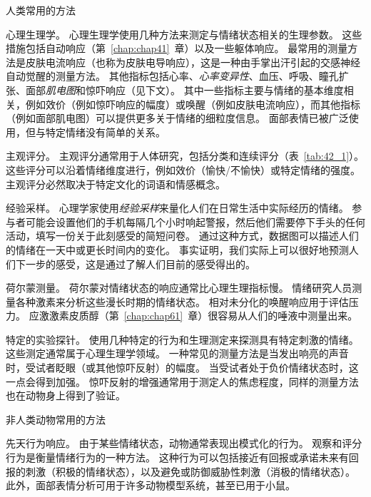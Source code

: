 \begin{proposition}[测量情绪的方法] \label{box:42_1}
	
	\quad \quad \textcolor[HTML]{00A652}{人类常用的方法}
	
	\quad \quad \textcolor[HTML]{00AEF7}{心理生理学}。
	心理生理学使用几种方法来测定与情绪状态相关的生理参数。
	这些措施包括自动响应（第~\ref{chap:chap41}~章）以及一些躯体响应。
	最常用的测量方法是皮肤电流响应（也称为皮肤电导响应），这是一种由手掌出汗引起的交感神经自动觉醒的测量方法。
	其他指标包括心率、\textit{心率变异性}、血压、呼吸、瞳孔扩张、面部\textit{肌电图}和惊吓响应（见下文）。
	其中一些指标主要与情绪的基本维度相关，例如效价（例如惊吓响应的幅度）或唤醒（例如皮肤电流响应），而其他指标（例如面部肌电图）可以提供更多关于情绪的细粒度信息。
	面部表情已被广泛使用，但与特定情绪没有简单的关系。
	
	\quad \quad \textcolor[HTML]{00AEF7}{主观评分}。
	主观评分通常用于人体研究，包括分类和连续评分（表~\ref{tab:42_1}）。
	这些评分可以沿着情绪维度进行，例如效价（愉快/不愉快）或特定情绪的强度。
	主观评分必然取决于特定文化的词语和情感概念。
	
	\quad \quad \textcolor[HTML]{00AEF7}{经验采样}。
	心理学家使用\textit{经验采样}来量化人们在日常生活中实际经历的情绪。
	参与者可能会设置他们的手机每隔几个小时响起警报，然后他们需要停下手头的任何活动，填写一份关于此刻感受的简短问卷。
	通过这种方式，数据图可以描述人们的情绪在一天中或更长时间内的变化。
	事实证明，我们实际上可以很好地预测人们下一步的感受，这是通过了解人们目前的感受得出的。
	
	\quad \quad \textcolor[HTML]{00AEF7}{荷尔蒙测量}。
	荷尔蒙对情绪状态的响应通常比心理生理指标慢。
	情绪研究人员测量各种激素来分析这些漫长时期的情绪状态。
	相对未分化的唤醒响应用于评估压力。
	应激激素皮质醇（第~\ref{chap:chap61}~章）很容易从人们的唾液中测量出来。
	
	\quad \quad \textcolor[HTML]{00AEF7}{特定的实验探针}。
	使用几种特定的行为和生理测定来探测具有特定刺激的情绪。
	这些测定通常属于心理生理学领域。
	一种常见的测量方法是当发出响亮的声音时，受试者眨眼（或其他惊吓反射）的幅度。
	当受试者处于负价情绪状态时，这一点会得到加强。
	惊吓反射的增强通常用于测定人的焦虑程度，同样的测量方法也在动物身上得到了验证。
	
	\quad \quad \textcolor[HTML]{00A652}{非人类动物常用的方法}
	
	\quad \quad \textcolor[HTML]{00AEF7}{先天行为响应}。
	由于某些情绪状态，动物通常表现出模式化的行为。
	观察和评分行为是衡量情绪行为的一种方法。
	这种行为可以包括接近有回报或承诺未来有回报的刺激（积极的情绪状态），以及避免或防御威胁性刺激（消极的情绪状态）。
	此外，面部表情分析可用于许多动物模型系统，甚至已用于小鼠。
	

\end{proposition}
